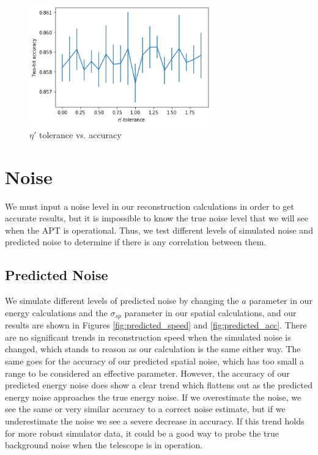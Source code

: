 \begin{figure}
    \centering
    \includegraphics[width=0.7\textwidth]{graphs/pi_eta_acc.png}
    \caption{$\eta'$ tolerance vs. accuracy}
    \label{fig:eta_acc}
\end{figure}

\section{Noise}
We must input a noise level in our reconstruction calculations in order to get accurate results, but it is impossible to know the true noise level that we will see when the APT is operational. Thus, we test different levels of simulated noise and predicted noise to determine if there is any correlation between them.

\subsection{Predicted Noise}
We simulate different levels of predicted noise by changing the $a$ parameter in our energy calculations and the $\sigma_{sp}$ parameter in our spatial calculations, and our results are shown in Figures \ref{fig:predicted_speed} and \ref{fig:predicted_acc}. There are no significant trends in reconstruction speed when the simulated noise is changed, which stands to reason as our calculation is the same either way. The same goes for the accuracy of our predicted spatial noise, which has too small a range to be considered an effective parameter. However, the accuracy of our predicted energy noise does show a clear trend which flattens out as the predicted energy noise approaches the true energy noise. If we overestimate the noise, we see the same or very similar accuracy to a correct noise estimate, but if we underestimate the noise we see a severe decrease in accuracy. If this trend holds for more robust simulator data, it could be a good way to probe the true background noise when the telescope is in operation.

